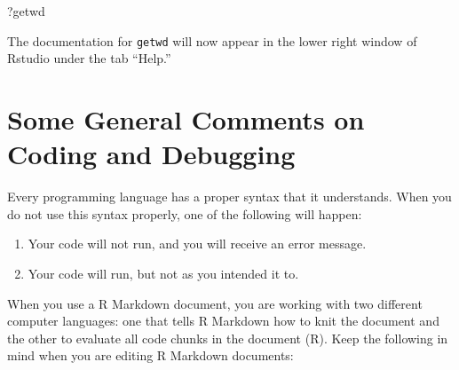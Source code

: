 \documentclass[]{article}
\newenvironment{Shaded}{\begin{snugshade}}{\end{snugshade}}
\newcommand{\NormalTok}[1]{#1}
\begin{document}
\begin{Shaded}
\begin{Highlighting}[]
\NormalTok{?getwd}
\end{Highlighting}
\end{Shaded}

The documentation for \texttt{getwd} will now appear in the lower right
window of Rstudio under the tab ``Help.''

\hypertarget{some-general-comments-on-coding-and-debugging}{%
\section{Some General Comments on Coding and
Debugging}\label{some-general-comments-on-coding-and-debugging}}

Every programming language has a proper syntax that it understands. When
you do not use this syntax properly, one of the following will happen:

\begin{enumerate}
\def\labelenumi{\arabic{enumi})}
\item
  Your code will not run, and you will receive an error message.
\item
  Your code will run, but not as you intended it to.
\end{enumerate}

When you use a R Markdown document, you are working with two different
computer languages: one that tells R Markdown how to knit the document
and the other to evaluate all code chunks in the document (R). Keep the
following in mind when you are editing R Markdown documents:
\end{document}
